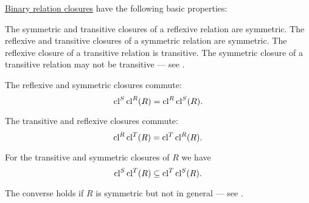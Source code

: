 \begin{proposition}\label{thm:def:relation_closures}
  \hyperref[def:relation_closures]{Binary relation closures} have the following basic properties:
  \begin{thmenum}
     The symmetric and transitive closures of a reflexive relation are symmetric.
     The reflexive and transitive closures of a symmetric relation are symmetric.
     The reflexive closure of a transitive relation is transitive. The symmetric closure of a transitive relation may not be transitive --- see .

     The reflexive and symmetric closures commute:
    \begin{equation}\label{eq:thm:def:relation_closures/reflexive_and_symmetric}
      \operatorname{cl}^S \operatorname{cl}^R(R) = \operatorname{cl}^R \operatorname{cl}^S(R).
    \end{equation}

     The transitive and reflexive closures commute:
    \begin{equation}\label{eq:thm:def:relation_closures/reflexive_and_transitive}
      \operatorname{cl}^R \operatorname{cl}^T(R) = \operatorname{cl}^T \operatorname{cl}^R(R).
    \end{equation}

     For the transitive and symmetric closures of \( R \) we have
    \begin{equation}\label{eq:thm:def:relation_closures/symmetric_and_transitive}
      \operatorname{cl}^S \operatorname{cl}^T(R) \subseteq \operatorname{cl}^T \operatorname{cl}^S(R).
    \end{equation}

    The converse holds if \( R \) is symmetric but not in general --- see .
  \end{thmenum}
\end{proposition}
